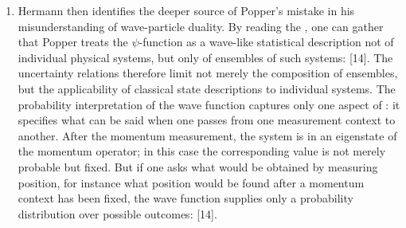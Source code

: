 \documentclass[final,12pt]{article}
\newcommand{\LdF}{\bt{Logik der Forschung}\xspace}
\newcommand{\UR}{uncertainty relations\xspace}
\begin{document}
\begin{enumerate}
\item Hermann then identifies the deeper source of Popper's mistake in his misunderstanding of wave-particle duality. By reading the \LdF, one can gather that Popper treats the $\psi$-function as a wave-like statistical description not of individual physical systems, but only of ensembles of such systems:  [14]. The \UR therefore limit not merely the composition of ensembles, but the applicability of classical state descriptions to individual systems. The probability interpretation of the wave function captures only one aspect of \qm: it specifies what can be said when one passes from one measurement context to another. After the momentum measurement, the system is in an eigenstate of the momentum operator; in this case the corresponding value is not merely probable but fixed. But if one asks what would be obtained by measuring position, for instance what position would be found after a momentum context has been fixed, the wave function supplies only a probability distribution over possible outcomes:  [14].



\end{enumerate}
\end{document}
